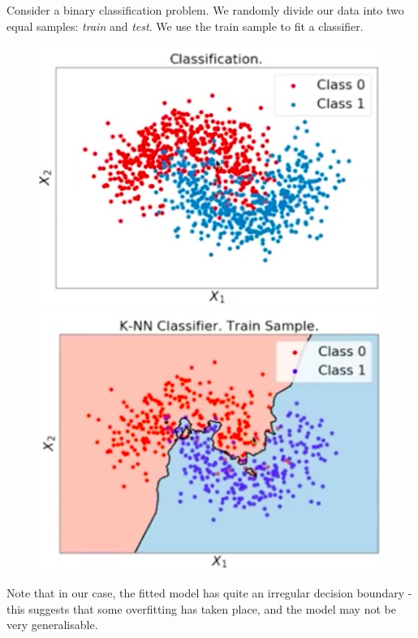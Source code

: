 \begin{frameex}
Consider a binary classification problem. We randomly divide our data into two equal samples: \textit{train} and \textit{test}. We use the train sample to fit a classifier. 
\begin{figure}[H]
\centering
\includegraphics[scale=0.4]{classifierexample.png}
\includegraphics[scale=0.4]{fittedclassifier.png}
\end{figure}
Note that in our case, the fitted model has quite an irregular decision boundary - this suggests that some overfitting has taken place, and the model may not be very generalisable.\\


\end{frameex}
